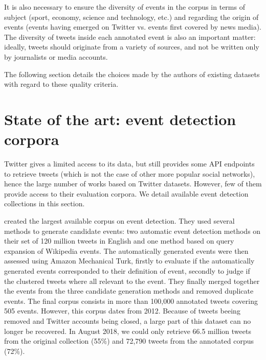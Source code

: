 It is also necessary to ensure the diversity of events in the corpus in terms of subject (sport, economy, science and technology, etc.) and regarding the origin of events (events having emerged on Twitter vs. events first covered by news media). The diversity of tweets inside each annotated event is also an important matter: ideally, tweets should originate from a variety of sources, and not be written only by journalists or media accounts.

The following section details the choices made by the authors of existing datasets with regard to these quality criteria.
        
		


\section{State of the art: event detection corpora}
\label{state of the art}
Twitter gives a limited access to its data, but still provides some API endpoints to retrieve tweets (which is not the case of other more popular social networks), hence the large number of works based on Twitter datasets. However, few of them provide access to their evaluation corpora. We detail available event detection collections in this section.

\citet{mcminn_building_2013} created the largest available corpus on event detection. They used several methods to generate candidate events: two automatic event detection methods on their set of 120 million tweets in English and one method based on query expansion of Wikipedia events. The automatically generated events were then assessed using Amazon Mechanical Turk, firstly to evaluate if the automatically generated events corresponded to their definition of event, secondly to judge if the clustered tweets where all relevant to the event. They finally merged together the events from the three candidate generation methods and removed duplicate events. The final corpus consists in more than 100,000 annotated tweets covering 505 events. However, this corpus dates from 2012. Because of tweets beeing removed and Twitter accounts being closed, a large part of this dataset can no longer be recovered. In August 2018, we could only retrieve 66.5 million tweets from the original collection (55\%) and 72,790 tweets from  the annotated corpus (72\%).


